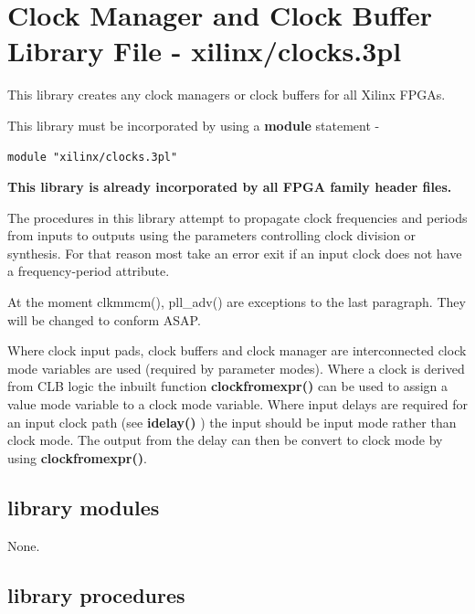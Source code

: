 \pagebreak

\section{Clock Manager and Clock Buffer Library File - xilinx/clocks.3pl}

    This library creates any clock managers or clock buffers for all Xilinx
    FPGAs.
    
    This library must be incorporated by using a {\bf module} statement -
    \begin{lstlisting}[gobble=4, language=threepl]
       module "xilinx/clocks.3pl"
    \end{lstlisting}
    
    {\bf This library is already incorporated by all FPGA family header files.}
    
    The procedures in this library attempt to propagate clock frequencies and
    periods from inputs to outputs using the parameters controlling clock
    division or synthesis. For that reason most take an error exit if an input
    clock does not have a frequency-period attribute.

    At the moment clkmmcm(), pll\_adv() are exceptions to the last paragraph.
    They will be changed to conform ASAP.
    
    Where clock input pads, clock buffers and clock manager are interconnected
    clock mode variables are used (required by parameter modes). Where a clock
    is derived from CLB logic the inbuilt function {\bf clockfromexpr()}
     can be used to assign a value mode variable
    to a clock mode variable. Where input delays are required for an input clock
    path (see {\bf idelay()} ) the input should be input
    mode rather than clock mode. The output from the delay can then be convert
    to clock mode by using {\bf clockfromexpr()}.



    \subsection{library modules}
    
        None.


    \subsection{library procedures}

